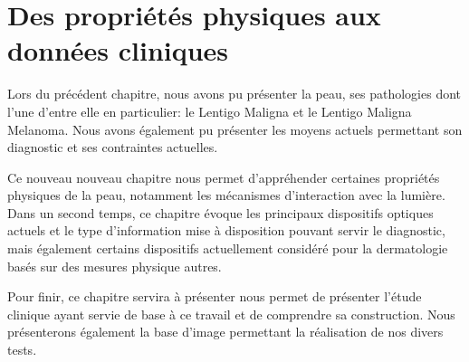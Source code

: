 \chapter{Des propriétés physiques aux données cliniques}
\label{chap:chapter_2}
\chapterintro
Lors du précédent chapitre, nous avons pu présenter la peau, ses pathologies dont l'une d'entre elle en particulier: le Lentigo Maligna et le Lentigo Maligna Melanoma. Nous avons également pu présenter les moyens actuels permettant son diagnostic et ses contraintes actuelles.\par
Ce nouveau nouveau chapitre nous permet d'appréhender certaines propriétés physiques de la peau, notamment les mécanismes d'interaction avec la lumière. Dans un second temps, ce chapitre évoque les principaux dispositifs optiques actuels et le type d'information mise à disposition pouvant servir le diagnostic, mais également certains dispositifs actuellement considéré pour la dermatologie basés sur des mesures physique autres.\par
Pour finir, ce chapitre servira à présenter nous permet de présenter l'étude clinique ayant servie de base à ce travail et de comprendre sa construction. Nous présenterons également la base d'image permettant la réalisation de nos divers tests.\par 
\newpage

